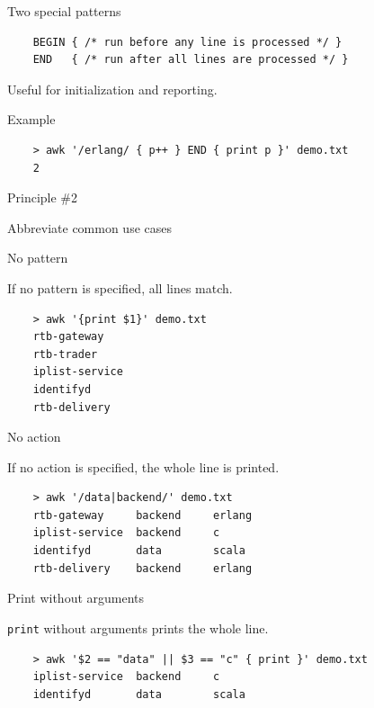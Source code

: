 \documentclass{beamer}
\renewcommand\big[1]{
  \begin{center}
    \Large{#1}
  \end{center}
}
\begin{document}
\begin{frame}[fragile]
  \big{Two special patterns}

  \begin{lstlisting}
    BEGIN { /* run before any line is processed */ }
    END   { /* run after all lines are processed */ }
  \end{lstlisting}

  \begin{center}Useful for initialization and reporting.\end{center}
\end{frame}

\begin{frame}[fragile]
  \big{Example}
  \begin{lstlisting}
    > awk '/erlang/ { p++ } END { print p }' demo.txt
    2
  \end{lstlisting}
\end{frame}

\begin{frame}
  \centering\Huge{Principle \#2}
  \big{Abbreviate common use cases}
\end{frame}

\begin{frame}[fragile]
  \big{No pattern}

  If no pattern is specified, all lines match.

  \begin{lstlisting}
    > awk '{print $1}' demo.txt
    rtb-gateway
    rtb-trader
    iplist-service
    identifyd
    rtb-delivery
  \end{lstlisting}
\end{frame}

\begin{frame}[fragile]
  \big{No action}

  If no action is specified, the whole line is printed.

  \begin{lstlisting}
    > awk '/data|backend/' demo.txt
    rtb-gateway     backend     erlang
    iplist-service  backend     c
    identifyd       data        scala
    rtb-delivery    backend     erlang
  \end{lstlisting}
\end{frame}

\begin{frame}[fragile]
  \big{Print without arguments}

  \texttt{print} without arguments prints the whole line.

  \begin{lstlisting}
    > awk '$2 == "data" || $3 == "c" { print }' demo.txt
    iplist-service  backend     c
    identifyd       data        scala
  \end{lstlisting}
\end{frame}
\end{document}
